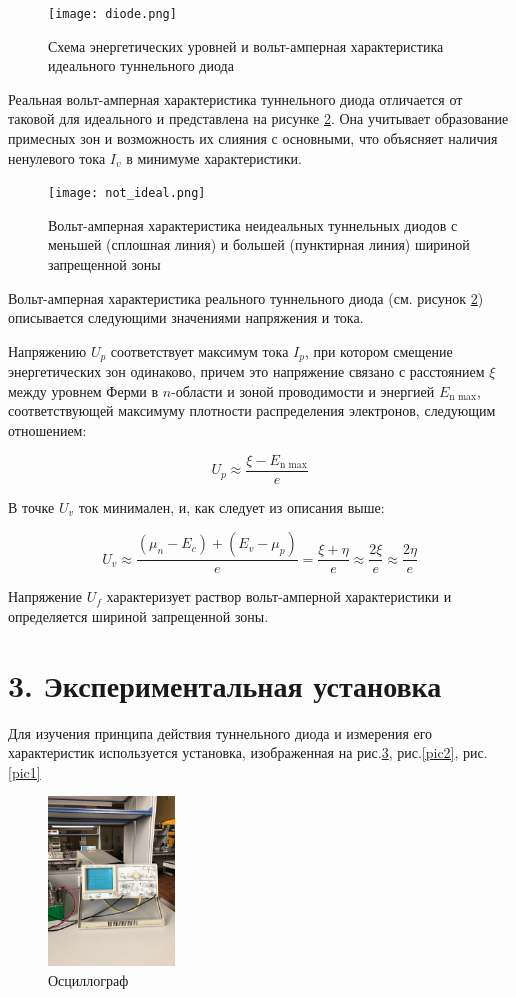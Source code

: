 \documentclass[a4paper,12pt]{report}
\begin{document}
\begin{figure}[h]
    \centering	
    \texttt{[image: diode.png]}
    \caption{Схема энергетических уровней и вольт-амперная характеристика идеального туннельного диода}
    \label{pic:diode}
\end{figure}  
	
Реальная вольт-амперная характеристика туннельного диода отличается от таковой для идеального и представлена на рисунке \ref{pic:not_ideal}. Она учитывает образование примесных зон и возможность их слияния с основными, что объясняет наличия ненулевого тока $I_v$ в минимуме характеристики. 
	
\begin{figure}[h]
    \centering	
    \texttt{[image: not\_ideal.png]}
    \caption{Вольт-амперная характеристика неидеальных туннельных диодов с меньшей (сплошная линия) и большей (пунктирная линия) шириной запрещенной зоны}
    \label{pic:not_ideal}
\end{figure}  
	
Вольт-амперная характеристика реального туннельного диода (см. рисунок \ref{pic:not_ideal}) описывается следующими значениями напряжения и тока. 
	
Напряжению $U_p$ соответствует максимум тока $I_p$, при котором смещение энергетических зон одинаково, причем это напряжение связано с расстоянием $\xi$ между уровнем Ферми в $n$-области и зоной проводимости и энергией $E_\text{n max}$, соответствующей максимуму плотности распределения электронов, следующим отношением: 
	
\[ U_p \approx \frac{\xi - E_\text{n max}}{e} \]
	
В точке $U_v$ ток минимален, и, как следует из описания выше:
	
\[ U_v \approx \frac{(\mu_n - E_c) + (E_v - \mu_p)}{e} = \frac{\xi + \eta}{e} \approx \frac{2\xi}{e} \approx \frac{2\eta}{e} \]
	
Напряжение $U_f$ характеризует раствор вольт-амперной характеристики и определяется шириной запрещенной зоны. 

\section*{3. Экспериментальная установка}

Для изучения принципа действия туннельного диода и измерения его характеристик используется установка, изображенная на рис.\ref{pic3}, рис.\ref{pic2}, рис.\ref{pic1}

\begin{figure}[H]
    \centering	
    \includegraphics[width=0.3\textwidth]{3.jpg}
    \caption{Осциллограф}
    \label{pic3}
\end{figure} 
\end{document}
